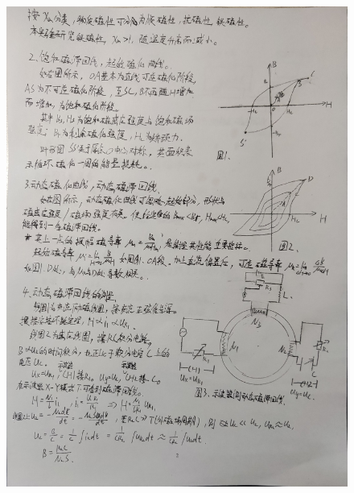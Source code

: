 \documentclass[11pt]{article}
\begin{document}
    \begin{figure}[H]
        \centering
        \includegraphics[width=16cm]{Fig/2.jpg}
    \end{figure}
\end{document}
